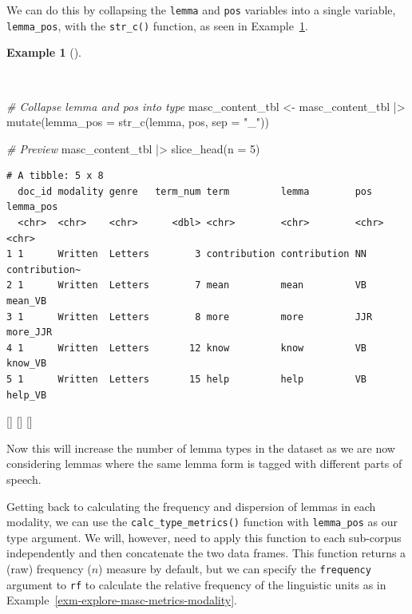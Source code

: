 \documentclass[
  letterpaper,
  krantz1]{latex/krantz-mod}
\newenvironment{Shaded}{\begin{snugshade}}{\end{snugshade}}
\newcommand{\AttributeTok}[1]{\textcolor[rgb]{0.00,0.00,0.00}{#1}}
\newcommand{\CommentTok}[1]{\textcolor[rgb]{0.00,0.00,0.00}{\textit{#1}}}
\newcommand{\DecValTok}[1]{\textcolor[rgb]{0.00,0.00,0.00}{#1}}
\newcommand{\FunctionTok}[1]{\textcolor[rgb]{0.00,0.00,0.00}{#1}}
\newcommand{\NormalTok}[1]{\textcolor[rgb]{0.00,0.00,0.00}{#1}}
\newcommand{\OtherTok}[1]{\textcolor[rgb]{0.00,0.00,0.00}{#1}}
\newcommand{\SpecialCharTok}[1]{\textcolor[rgb]{0.00,0.00,0.00}{#1}}
\newcommand{\StringTok}[1]{\textcolor[rgb]{0.00,0.00,0.00}{#1}}
\newcommand{\cindex}[1]{%
  \StrSubstitute{#1}{_}{\_}[\temp]%
  \index{\temp}%
}
\theoremstyle{definition}
\theoremstyle{definition}
\newtheorem{example}{Example}[chapter]
\theoremstyle{remark}
\begin{document}
We can do this by collapsing the \texttt{lemma} and \texttt{pos}
variables into a single variable, \texttt{lemma\_pos}, with the
\texttt{str\_c()} function, as seen in
Example~\ref{exm-explore-masc-type}.

\begin{example}[]\protect\hypertarget{exm-explore-masc-type}{}\label{exm-explore-masc-type}

~

\begin{Shaded}
\begin{Highlighting}[numbers=left,,]
\CommentTok{\# Collapse lemma and pos into type}
\NormalTok{masc\_content\_tbl }\OtherTok{\textless{}{-}}
\NormalTok{  masc\_content\_tbl }\SpecialCharTok{|\textgreater{}}
  \FunctionTok{mutate}\NormalTok{(}\AttributeTok{lemma\_pos =} \FunctionTok{str\_c}\NormalTok{(lemma, pos, }\AttributeTok{sep =} \StringTok{"\_"}\NormalTok{))}

\CommentTok{\# Preview}
\NormalTok{masc\_content\_tbl }\SpecialCharTok{|\textgreater{}}
  \FunctionTok{slice\_head}\NormalTok{(}\AttributeTok{n =} \DecValTok{5}\NormalTok{)}
\end{Highlighting}
\end{Shaded}

\begin{verbatim}
# A tibble: 5 x 8
  doc_id modality genre   term_num term         lemma        pos   lemma_pos    
  <chr>  <chr>    <chr>      <dbl> <chr>        <chr>        <chr> <chr>        
1 1      Written  Letters        3 contribution contribution NN    contribution~
2 1      Written  Letters        7 mean         mean         VB    mean_VB      
3 1      Written  Letters        8 more         more         JJR   more_JJR     
4 1      Written  Letters       12 know         know         VB    know_VB      
5 1      Written  Letters       15 help         help         VB    help_VB      
\end{verbatim}

\cindex{mutate()}\cindex{str_c()}\cindex{slice_head()}

\end{example}

Now this will increase the number of lemma types in the dataset as we
are now considering lemmas where the same lemma form is tagged with
different parts of speech.

Getting back to calculating the frequency and dispersion of lemmas in
each modality, we can use the \texttt{calc\_type\_metrics()} function
with \texttt{lemma\_pos} as our type argument. We will, however, need to
apply this function to each sub-corpus independently and then
concatenate the two data frames. This
function returns a (raw) frequency (\(n\)) measure by default, but we
can specify the \texttt{frequency} argument to \texttt{rf} to calculate
the relative frequency of the linguistic units as in
Example~\ref{exm-explore-masc-metrics-modality}.
\end{document}
